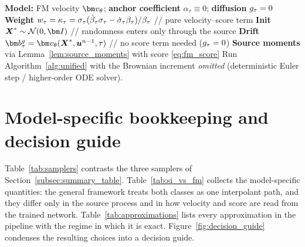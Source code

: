 \begin{algorithm}[ht]
\caption{Sampler 3 -- Guided probability-flow ODE (flow matching, deterministic)}
\label{alg:fm_ode}
\begin{algorithmic}[1]
\STATE \textbf{Model:} FM velocity $\fmvel_\theta$; \textbf{anchor coefficient} $\alpha_\tau\equiv0$; \textbf{diffusion} $g_\tau=0$
\STATE \textbf{Weight} $w_\tau = \kappa_\tau = \sigma_\tau(\dot\beta_\tau\sigma_\tau-\dot{\sigma}_\tau\beta_\tau)/\beta_\tau$ \hfill // pure velocity--score term
\STATE \textbf{Init} $\bXstar\sim\mathcal{N}(0,\bI)$ \hfill // randomness enters only through the source
\STATE \textbf{Drift} $\drift^{\gdiff}_\tau=\fmvel_\theta(\bXstar,\state^{n-1},\tau)$ \hfill // no score term needed ($g_\tau=0$)
\STATE \textbf{Source moments} via Lemma~\ref{lem:source_moments} with score \eqref{eq:fm_score}
\STATE Run Algorithm~\ref{alg:unified} with the Brownian increment \emph{omitted} (deterministic Euler step / higher-order ODE solver).
\end{algorithmic}
\end{algorithm}

\section{Model-specific bookkeeping and decision guide}\label{appendix:bookkeeping}

Table~\ref{tab:samplers} contrasts the three samplers of Section~\ref{subsec:summary_table}. Table~\ref{tab:si_vs_fm} collects the model-specific quantities: the general framework treats both classes as one interpolant path, and they differ only in the source process and in how velocity and score are read from the trained network. Table~\ref{tab:approximations} lists every approximation in the pipeline with the regime in which it is exact. Figure~\ref{fig:decision_guide} condenses the resulting choices into a decision guide.



